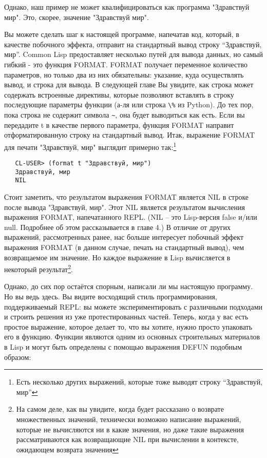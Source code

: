 Однако, наш пример не может квалифицироваться как программа "Здравствуй мир". Это, скорее,
значение "Здравствуй мир".

Вы можете сделать шаг к настоящей программе, напечатав код, который, в качестве побочного
эффекта, отправит на стандартный вывод строку ``Здравствуй, мир''. Common Lisp предоставляет
несколько путей для вывода данных, но самый гибкий - это функция FORMAT. FORMAT получает
переменное количество параметров, но только два из них обязательны: указание, куда
осуществлять вывод, и строка для вывода. В следующей главе Вы увидите, как строка может
содержать встроенные директивы, которые позволяют вставлять в строку последующие параметры
функции (а-ля  или строка \lstinline|\%| из Python). До тех пор, пока строка
не содержит символа \lstinline|~|, она будет выводиться как есть. Если вы передадите t в
качестве первого параметра, функция FORMAT направит отформатированную строку на
стандартный вывод. Итак, выражение FORMAT для печати "Здравствуй, мир" выглядит примерно
так:\footnote{Есть несколько других выражений, которые тоже выводят строку ``Здравствуй, мир''}

\begin{verbatim}
   CL-USER> (format t "Здравствуй, мир")
   Здравствуй, мир
   NIL
\end{verbatim}

Стоит заметить, что результатом выражения FORMAT является NIL в строке после вывода
"Здравствуй, мир". Этот NIL является результатом вычисления выражения FORMAT,
напечатанного REPL. (NIL -- это Lisp-версия false и/или null. Подробнее об этом
рассказывается в главе 4.) В отличие от других выражений, рассмотренных ранее, нас больше
интересует побочный эффект выражения FORMAT (в данном случае, печать на стандартный
вывод), чем возвращаемое им значение. Но каждое выражение в Lisp вычисляется в некоторый
результат\footnote{На самом деле, как вы увидите, когда будет рассказано о возврате
  множественных значений, технически возможно написание выражений, которые не вычисляются
  ни в какие значения, но даже такие выражения рассматриваются как возвращающие NIL при
  вычислении в контексте, ожидающем возврата значения}.

Однако, до сих пор остаётся спорным, написали ли мы настоящую программу. Но вы ведь
здесь. Вы видите восходящий стиль программирования, поддерживаемый REPL: вы можете
экспериментировать с различными подходами и строить решения из уже протестированных
частей. Теперь, когда у вас есть простое выражение, которое делает то, что вы хотите,
нужно просто упаковать его в функцию. Функции являются одним из основных строительных
материалов в Lisp и могут быть определены с помощью выражения DEFUN подобным образом:

